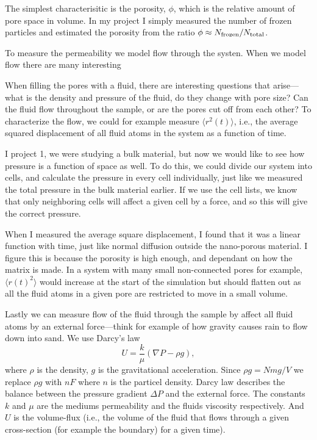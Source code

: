 \documentclass[a4paper, 11pt, notitlepage, english]{article}
\begin{document}
The simplest characterisitic is the porosity, $\phi$, which is the relative amount of pore space in volume. In my project I simply measured the number of frozen particles and estimated the porosity from the ratio $\phi \approx N_{\rm frozen}/N_{\rm total}$.

To measure the permeability we model flow through the systen. When we model flow there are many interesting 



When filling the pores with a fluid, there are interesting questions that arise---what is the density and pressure of the fluid, do they change with pore size? Can the fluid flow throughout the sample, or are the pores cut off from each other? To characterize the flow, we could for example measure $\langle r^2(t) \rangle$, i.e., the average squared displacement of all fluid atoms in the system as a function of time.

I project 1, we were studying a bulk material, but now we would like to see how pressure is a function of space as well. To do this, we could divide our system into cells, and calculate the pressure in every cell individually, just like we measured the total pressure in the bulk material earlier. If we use the cell lists, we know that only neighboring cells will affect a given cell by a force, and so this will give the correct pressure.

When I measured the average square displacement, I found that it was a linear function with time, just like normal diffusion outside the nano-porous material. I figure this is because the porosity is high enough, and dependant on how the matrix is made. In a system with many small non-connected pores for example, $\langle r(t)^2 \rangle$ would increase at the start of the simulation but should flatten out as all the fluid atoms in a given pore are restricted to move in a small volume.

Lastly we can measure flow of the fluid through the sample by affect all fluid atoms by an external force---think for example of how gravity causes rain to flow down into sand. We use Darcy's law
$$U = \frac{k}{\mu}(\nabla P - \rho g),$$
where $\rho$ is the density, $g$ is the gravitational acceleration. Since $\rho g = Nmg/V$ we replace $\rho g$ with $nF$ where $n$ is the particel density. Darcy law describes the balance between the pressure gradient $\Delta P$ and the external force. The constants $k$ and $\mu$ are the mediums permeability and the fluids viscosity respectively. And $U$ is the volume-flux (i.e., the volume of the fluid that flows through a given cross-section (for example the boundary) for a given time).
\end{document}

